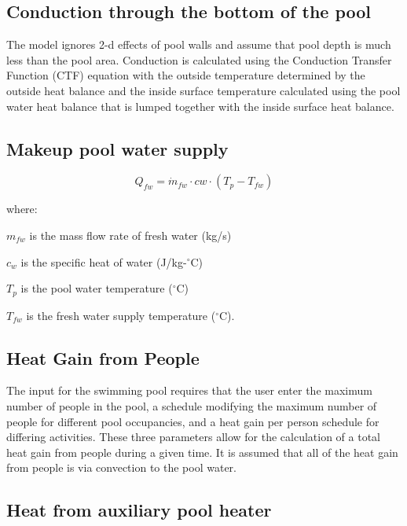 \subsection{Conduction through the bottom of the pool}\label{conduction-through-the-bottom-of-the-pool}

The model ignores 2-d effects of pool walls and assume that pool depth is much less than the pool area. Conduction is calculated using the Conduction Transfer Function (CTF) equation with the outside temperature determined by the outside heat balance and the inside surface temperature calculated using the pool water heat balance that is lumped together with the inside surface heat balance.

\subsection{Makeup pool water supply}\label{makeup-pool-water-supply}

\begin{equation}
Q_{fw} = \dot{m}_{fw} \cdot cw \cdot (T_p - T_{fw})
\end{equation}

where:

\(m_{fw}\) is the mass flow rate of fresh water (kg/s)

\(c_w\) is the specific heat of water (J/kg-\(^{\circ}\)C)

\(T_p\) is the pool water temperature (\(^{\circ}\)C)

\(T_{fw}\) is the fresh water supply temperature (\(^{\circ}\)C).

\subsection{Heat Gain from People}\label{heat-gain-from-people}

The input for the swimming pool requires that the user enter the maximum number of people in the pool, a schedule modifying the maximum number of people for different pool occupancies, and a heat gain per person schedule for differing activities. These three parameters allow for the calculation of a total heat gain from people during a given time. It is assumed that all of the heat gain from people is via convection to the pool water.

\subsection{Heat from auxiliary pool heater}\label{heat-from-auxiliary-pool-heater}

